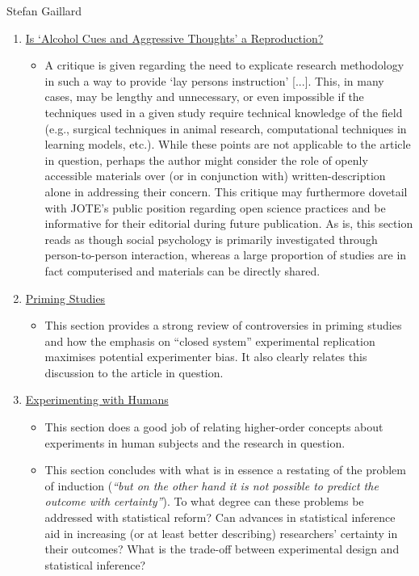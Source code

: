 \documentclass[twocolumn, serif, review, authordate]{jote-article}
\begin{document}
\begin{paracol}{2}
\begin{reviewend}{Stefan Gaillard}
\begin{enumerate}[label=\textbf{\arabic*}), start=0]
    \item \hyperref[sec:reproduction]{Is `Alcohol Cues and Aggressive Thoughts' a Reproduction?}
        \begin{itemize}
            \item A critique is given regarding the need to explicate research methodology in such a way to provide `lay persons instruction' [...]. This, in many cases, may be lengthy and unnecessary, or even impossible if the techniques used in a given study require technical knowledge of the field (e.g., surgical techniques in animal research, computational techniques in learning models, etc.). While these points are not applicable to the article in question, perhaps the author might consider the role of openly accessible materials over (or in conjunction with) written-description alone in addressing their concern. This critique may furthermore dovetail with JOTE's public position regarding open science practices and be informative for their editorial during future publication. As is, this section reads as though social psychology is primarily investigated through person-to-person interaction, whereas a large proportion of studies are in fact computerised and materials can be directly shared.
        \end{itemize}
        
    \item \hyperref[sec:priming]{Priming Studies}
        \begin{itemize}
            \item This section provides a strong review of controversies in priming studies and how the emphasis on ``closed system'' experimental replication maximises potential experimenter bias. It also clearly relates this discussion to the article in question.  
        \end{itemize}
        
    \item \hyperref[sec:humans]{Experimenting with Humans}
        \begin{itemize}
            \item This section does a good job of relating higher-order concepts about experiments in human subjects and the research in question.  
            \item This section concludes with what is in essence a restating of the problem of induction (\textit{``but on the other hand it is not possible to predict the outcome with certainty''}). To what degree can these problems be addressed with statistical reform? Can advances in statistical inference aid in increasing (or at least better describing) researchers’ certainty in their outcomes? What is the trade-off between experimental design and statistical inference? 
        \end{itemize}
        

\end{enumerate}
\end{reviewend}
\end{paracol}
\end{document}
